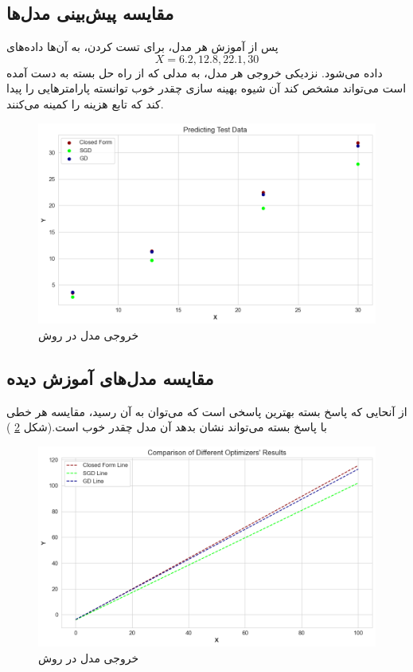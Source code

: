 \documentclass{article}
\begin{document}
	\subsection{مقایسه پیش‌بینی مدل‌ها}
	پس از آموزش هر مدل، برای تست کردن، به آن‌ها داده‌های 
	\[X = 6.2, 12.8, 22.1, 30\]
	داده می‌شود. نزدیکی خروجی هر مدل، به مدلی که از راه حل بسته به دست آمده است می‌تواند مشخص کند آن شیوه بهینه سازی چقدر خوب توانسته پارامترهایی را پیدا کند که تابع هزینه را کمینه می‌کنند.
	\begin{figure}[H]
		\centering
		\includegraphics[scale=0.5]{figs/prediction_one_var}
		\caption{خروجی مدل در روش}
		\label{fig: prediction one var}
	\end{figure}
	
		 
	\subsection{مقایسه مدل‌های آموزش دیده}
	از آنحایی که پاسخ بسته بهترین پاسخی است که می‌توان به آن رسید، مقایسه هر خطی با پاسخ بسته می‌تواند نشان بدهد آن مدل چقدر خوب است.(شکل 
	\ref{fig: lines one var}
	)
	\begin{figure}[H]
		\centering
		\includegraphics[scale=0.5]{figs/lines_one_var}
		\caption{خروجی مدل در روش}
		\label{fig: lines one var}
	\end{figure}
	
\end{document}
